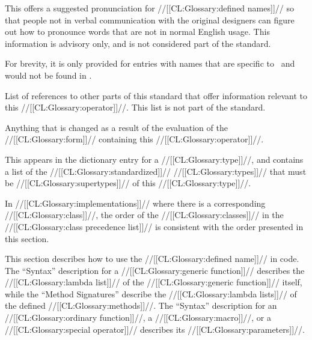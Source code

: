 \endsubsubsection%


This offers a suggested pronunciation for //[[CL:Glossary:defined names]]//  so that people not in verbal communication with the original designers can figure out how to pronounce words that are not in normal English usage. This information is advisory only, and is not considered part of the standard.

For brevity, it is only provided for entries with names that are specific to \clisp\ and would not be found in {\WebstersDictionary}.

\endsubsubsection%


List of references to other parts of this standard that offer information relevant to this //[[CL:Glossary:operator]]//.  This list is not part of the standard.
          \endsubsubsection%


Anything that is changed as a result of the evaluation of the //[[CL:Glossary:form]]// containing this //[[CL:Glossary:operator]]//.

\endsubsubsection%


This appears in the dictionary entry for a //[[CL:Glossary:type]]//, and contains a list of the //[[CL:Glossary:standardized]]// //[[CL:Glossary:types]]//  that must be //[[CL:Glossary:supertypes]]// of this //[[CL:Glossary:type]]//.

In //[[CL:Glossary:implementations]]// where there is a corresponding //[[CL:Glossary:class]]//, the order of the //[[CL:Glossary:classes]]// in the //[[CL:Glossary:class precedence list]]//  is consistent with the order presented in this section.

\endsubsubsection%


This section describes how to use the //[[CL:Glossary:defined name]]// in code. The ``Syntax'' description for a //[[CL:Glossary:generic function]]//  describes the //[[CL:Glossary:lambda list]]// of the //[[CL:Glossary:generic function]]// itself,  while the ``Method Signatures'' describe the //[[CL:Glossary:lambda lists]]//  of the defined //[[CL:Glossary:methods]]//. The ``Syntax'' description for 
     an //[[CL:Glossary:ordinary function]]//,
     a //[[CL:Glossary:macro]]//,
  or a //[[CL:Glossary:special operator]]// describes its //[[CL:Glossary:parameters]]//.

